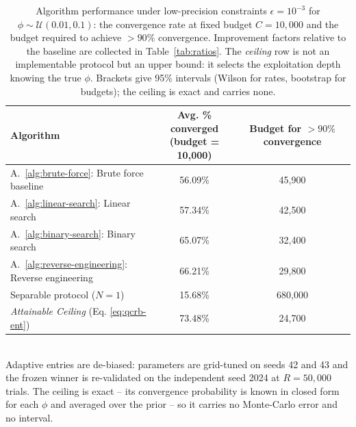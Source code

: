 \begin{table}[ht]
\centering
\caption{Algorithm performance under low-precision constraints $\epsilon=10^{-3}$ for $\phi\sim\mathcal{U}(0.01,0.1)$: the convergence rate at fixed budget $C=10{,}000$ and the budget required to achieve \(>90\%\) convergence. Improvement factors relative to the baseline are collected in Table~\ref{tab:ratios}. The \textit{ceiling} row is not an implementable protocol but an upper bound: it selects the exploitation depth knowing the true $\phi$. Brackets give 95\% intervals (Wilson for rates, bootstrap for budgets); the ceiling is exact and carries none.}
\label{tab:summary-low-prec-ci}
\begin{tabular}{lcc}
\toprule
Algorithm
& \makecell{Avg. \% converged \\ (budget = 10{,}000)}
& \makecell{Budget for $>90\%$ \\ convergence} \\
\midrule
A.~\ref{alg:brute-force}: Brute force baseline
& 56.09\% \newline {\scriptsize [55.66, 56.53]}
& 45{,}900 \newline {\scriptsize [45{,}300, 46{,}500]} \\
A.~\ref{alg:linear-search}: Linear search
& 57.34\% \newline {\scriptsize [56.91, 57.78]}
& 42{,}500 \newline {\scriptsize [41{,}600, 43{,}200]} \\
A.~\ref{alg:binary-search}: Binary search
& 65.07\% \newline {\scriptsize [64.65, 65.49]}
& 32{,}400 \newline {\scriptsize [32{,}000, 32{,}900]} \\
A.~\ref{alg:reverse-engineering}: Reverse engineering
& 66.21\% \newline {\scriptsize [65.79, 66.62]}
& 29{,}800 \newline {\scriptsize [29{,}200, 30{,}300]} \\
\midrule
Separable protocol ($N=1$)
& 15.68\% \newline {\scriptsize [15.36, 16.00]}
& 680{,}000 \newline {\scriptsize [669{,}000, 691{,}000]} \\
\midrule
\textit{Attainable Ceiling} (Eq. \ref{eq:qcrb-ent})
& 73.48\%
& 24{,}700 \\
\bottomrule
\end{tabular}
\\[2pt]
\footnotesize Adaptive entries are de-biased: parameters are grid-tuned on seeds 42 and 43 and the frozen winner is re-validated on the independent seed 2024 at $R=50{,}000$ trials. The ceiling is exact -- its convergence probability is known in closed form for each $\phi$ and averaged over the prior -- so it carries no Monte-Carlo error and no interval.
\end{table}
